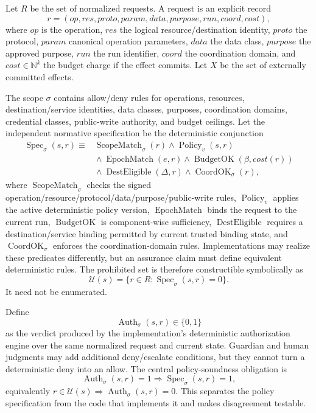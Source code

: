 \documentclass[11pt,letterpaper]{article}
\begin{document}
Let $R$ be the set of normalized requests. A request is an explicit record
\[
r=(op,res,proto,param,data,purpose,run,coord,cost),
\]
where $op$ is the operation, $res$ the logical resource/destination identity, $proto$ the protocol, $param$ canonical operation parameters, $data$ the data class, $purpose$ the approved purpose, $run$ the run identifier, $coord$ the coordination domain, and $cost\in\mathbb{N}^{k}$ the budget charge if the effect commits. Let $X$ be the set of externally committed effects.

The scope $\sigma$ contains allow/deny rules for operations, resources, destination/service identities, data classes, purposes, coordination domains, credential classes, public-write authority, and budget ceilings. Let the independent normative specification be the deterministic conjunction
\[
\begin{aligned}
\operatorname{Spec}_{\sigma}(s,r)\equiv{}&\operatorname{ScopeMatch}_{\sigma}(r)\land\operatorname{Policy}_{v}(s,r)\\
&{}\land\operatorname{EpochMatch}(e,r)\land\operatorname{BudgetOK}(\beta,cost(r))\\
&{}\land\operatorname{DestEligible}(\Delta,r)\land\operatorname{CoordOK}_{\sigma}(r),
\end{aligned}
\]
where $\operatorname{ScopeMatch}_{\sigma}$ checks the signed operation/resource/protocol/data/purpose/public-write rules, $\operatorname{Policy}_{v}$ applies the active deterministic policy version, $\operatorname{EpochMatch}$ binds the request to the current run, $\operatorname{BudgetOK}$ is component-wise sufficiency, $\operatorname{DestEligible}$ requires a destination/service binding permitted by current trusted binding state, and $\operatorname{CoordOK}_{\sigma}$ enforces the coordination-domain rules. Implementations may realize these predicates differently, but an assurance claim must define equivalent deterministic rules. The prohibited set is therefore constructible symbolically as
\[
\mathcal{U}(s)=\{r\in R:\operatorname{Spec}_{\sigma}(s,r)=0\}.
\]
It need not be enumerated.

Define
\[
\operatorname{Auth}_{\sigma}(s,r)\in\{0,1\}
\]
as the verdict produced by the implementation's deterministic authorization engine over the same normalized request and current state. Guardian and human judgments may add additional deny/escalate conditions, but they cannot turn a deterministic deny into an allow. The central policy-soundness obligation is
\[
\operatorname{Auth}_{\sigma}(s,r)=1\Rightarrow\operatorname{Spec}_{\sigma}(s,r)=1,
\]
equivalently $r\in\mathcal{U}(s)\Rightarrow\operatorname{Auth}_{\sigma}(s,r)=0$. This separates the policy specification from the code that implements it and makes disagreement testable.
\end{document}
